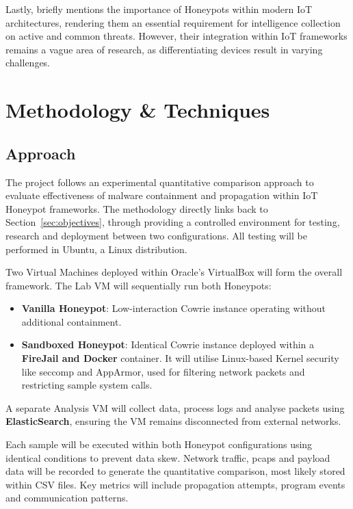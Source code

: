 \documentclass[a4paper,12pt,oneside]{book}			%
\begin{document}
Lastly, \textit{\citep{crowdstrike-honeypot}} briefly mentions the importance of Honeypots within modern IoT architectures, rendering them an essential requirement for intelligence collection on active and common threats. However, their integration within IoT frameworks remains a vague area of research, as differentiating devices result in varying challenges.

\chapter{Methodology \&{} Techniques}\label{ch:methods}
\section{Approach}\label{sec:approach}

The project follows an experimental quantitative comparison approach to evaluate effectiveness of malware containment and propagation within IoT Honeypot frameworks. The methodology directly links back to Section~\ref{sec:objectives}, through providing a controlled environment for testing, research and deployment between two configurations. All testing will be performed in Ubuntu, a Linux distribution.

Two Virtual Machines deployed within Oracle’s VirtualBox will form the overall framework. The Lab VM will sequentially run both Honeypots:
\begin{itemize}
	\item\textbf{Vanilla Honeypot}: Low-interaction Cowrie instance operating without additional containment.
	\item\textbf{Sandboxed Honeypot}: Identical Cowrie instance deployed within a \textbf{FireJail and Docker} container. It will utilise Linux-based Kernel security like seccomp and AppArmor, used for filtering network packets and restricting sample system calls.
\end{itemize}

A separate Analysis VM will collect data, process logs and analyse packets using \textbf{ElasticSearch}, ensuring the VM remains disconnected from external networks.

Each sample will be executed within both Honeypot configurations using identical conditions to prevent data skew. Network traffic, pcaps and payload data will be recorded to generate the quantitative comparison, most likely stored within CSV files. Key metrics will include propagation attempts, program events and communication patterns.
\end{document}
